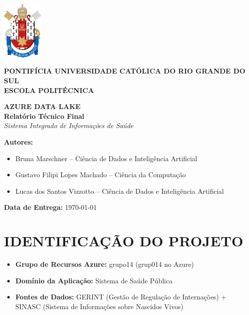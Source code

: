 \documentclass[12pt,a4paper]{article}
\begin{document}
\begin{titlepage}
    \centering
    \includegraphics[width=0.15\textwidth]{logo_pucrs.png} %

    \vspace*{2cm}
    {\Large \textbf{PONTIFÍCIA UNIVERSIDADE CATÓLICA DO RIO GRANDE DO SUL}}\\[0.3cm]
    {\large \textbf{ESCOLA POLITÉCNICA}}\\[1.2cm]
    
    \vfill

    {\Huge \textbf{AZURE DATA LAKE}}\\[0.4cm]
    {\Large \textbf{Relatório Técnico Final}}\\[0.5cm]
    {\large \textit{Sistema Integrado de Informações de Saúde}}\\

    \vfill

    \begin{flushleft}
    \textbf{Autores:}
    \begin{itemize}[leftmargin=1.5cm]
        \item Bruna Marschner – Ciência de Dados e Inteligência Artificial
        \item Gustavo Filipi Lopes Machado – Ciência da Computação
        \item Lucas dos Santos Vizzotto – Ciência de Dados e Inteligência Artificial
    \end{itemize}

    \vspace{1cm}
    \textbf{Data de Entrega:} \today
    \end{flushleft}


\end{titlepage}
\newpage
\tableofcontents
\newpage

\section{IDENTIFICAÇÃO DO PROJETO}

\begin{itemize}[leftmargin=2cm]
    \item \textbf{Grupo de Recursos Azure:} grupo14 (grup014 no Azure)
    \item \textbf{Domínio da Aplicação:} Sistema de Saúde Pública
    \item \textbf{Fontes de Dados:} GERINT (Gestão de Regulação de Internações) + SINASC (Sistema de Informações sobre Nascidos Vivos)
\end{itemize}
\end{document}
